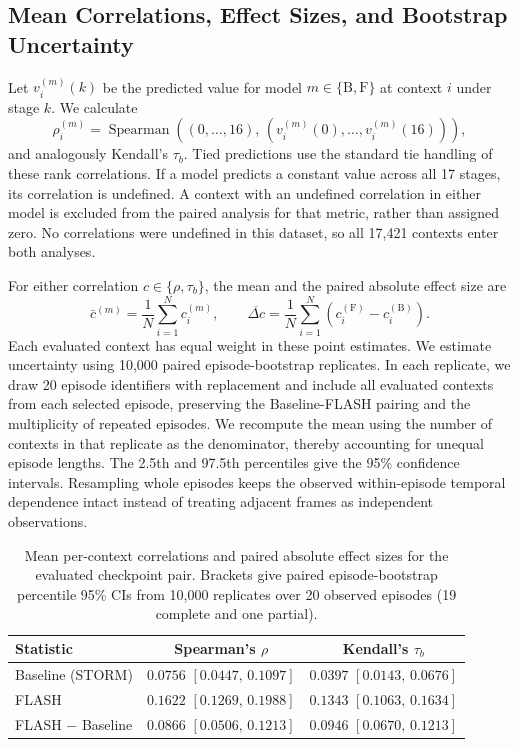 \documentclass{article} %
\begin{document}
\subsection{Mean Correlations, Effect Sizes, and Bootstrap Uncertainty}
Let $v_i^{(m)}(k)$ be the predicted value for model $m\in\{\mathrm{B},\mathrm{F}\}$ at context $i$ under stage $k$. We calculate
\begin{equation}
\rho_i^{(m)}=\operatorname{Spearman}\!\left((0,\ldots,16),\,(v_i^{(m)}(0),\ldots,v_i^{(m)}(16))\right),
\label{eq:value_context_rho}
\end{equation}
and analogously Kendall's $\tau_b$. Tied predictions use the standard tie handling of these rank correlations. If a model predicts a constant value across all 17 stages, its correlation is undefined. A context with an undefined correlation in either model is excluded from the paired analysis for that metric, rather than assigned zero. No correlations were undefined in this dataset, so all 17,421 contexts enter both analyses.

For either correlation $c\in\{\rho,\tau_b\}$, the mean and the paired absolute effect size are
\begin{equation}
\bar c^{(m)}=\frac{1}{N}\sum_{i=1}^{N}c_i^{(m)},\qquad
\overline{\Delta c}=\frac{1}{N}\sum_{i=1}^{N}\left(c_i^{(\mathrm{F})}-c_i^{(\mathrm{B})}\right).
\label{eq:value_mean_effect}
\end{equation}
Each evaluated context has equal weight in these point estimates. We estimate uncertainty using 10,000 paired episode-bootstrap replicates. In each replicate, we draw 20 episode identifiers with replacement and include all evaluated contexts from each selected episode, preserving the Baseline-FLASH pairing and the multiplicity of repeated episodes. We recompute the mean using the number of contexts in that replicate as the denominator, thereby accounting for unequal episode lengths. The 2.5th and 97.5th percentiles give the 95\% confidence intervals. Resampling whole episodes keeps the observed within-episode temporal dependence intact instead of treating adjacent frames as independent observations.

\begin{table}[!t]
\centering
\small
\caption{Mean per-context correlations and paired absolute effect sizes for the evaluated checkpoint pair. Brackets give paired episode-bootstrap percentile 95\% CIs from 10,000 replicates over 20 observed episodes (19 complete and one partial).}
\label{tab:value_metrics}
\begin{tabular}{lcc}
\toprule
Statistic & Spearman's $\rho$ & Kendall's $\tau_b$ \\
\midrule
Baseline (STORM) & $0.0756$ $[0.0447,\,0.1097]$ & $0.0397$ $[0.0143,\,0.0676]$ \\
FLASH & $0.1622$ $[0.1269,\,0.1988]$ & $0.1343$ $[0.1063,\,0.1634]$ \\
FLASH $-$ Baseline & $0.0866$ $[0.0506,\,0.1213]$ & $0.0946$ $[0.0670,\,0.1213]$ \\
\bottomrule
\end{tabular}
\end{table}
\end{document}
